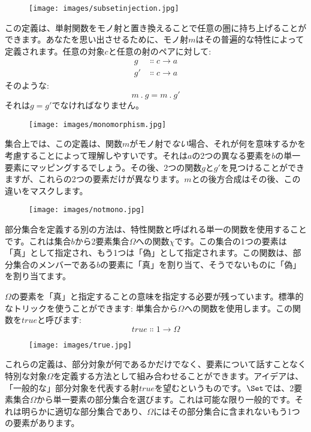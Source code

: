 \begin{figure}[H]
  \centering
  \texttt{[image: images/subsetinjection.jpg]}
\end{figure}

\noindent
この定義は、単射関数をモノ射と置き換えることで任意の圏に持ち上げることができます。あなたを思い出させるために、モノ射\(m\)はその普遍的な特性によって定義されます。任意の対象\(c\)と任意の射のペアに対して: 
\begin{align*}
  g  & \Colon c \to a \\
  g' & \Colon c \to a
\end{align*}
そのような: 
\[m\ .\ g = m\ .\ g'\]
それは\(g = g'\)でなければなりません。\begin{figure}[H]
  \centering
  \texttt{[image: images/monomorphism.jpg]}
\end{figure}

\noindent
集合上では、この定義は、関数\(m\)がモノ射で\emph{ない}場合、それが何を意味するかを考慮することによって理解しやすいです。それは\(a\)の2つの異なる要素を\(b\)の単一要素にマッピングするでしょう。その後、2つの関数\(g\)と\(g'\)を見つけることができますが、これらの2つの要素だけが異なります。\(m\)との後方合成はその後、この違いをマスクします。

\begin{figure}[H]
  \centering
  \texttt{[image: images/notmono.jpg]}
\end{figure}

\noindent
部分集合を定義する別の方法は、特性関数と呼ばれる単一の関数を使用することです。これは集合\(b\)から2要素集合\(\Omega\)への関数\(\chi\)です。この集合の1つの要素は「真」として指定され、もう1つは「偽」として指定されます。この関数は、部分集合のメンバーである\(b\)の要素に「真」を割り当て、そうでないものに「偽」を割り当てます。

\(\Omega\)の要素を「真」と指定することの意味を指定する必要が残っています。標準的なトリックを使うことができます: 単集合から\(\Omega\)への関数を使用します。この関数を\(\mathit{true}\)と呼びます: 
\[\mathit{true} \Colon 1 \to \Omega\]

\begin{figure}[H]
  \centering
  \texttt{[image: images/true.jpg]}
\end{figure}

\noindent
これらの定義は、部分対象が何であるかだけでなく、要素について話すことなく特別な対象\(\Omega\)を定義する方法として組み合わせることができます。アイデアは、「一般的な」部分対象を代表する射\(\mathit{true}\)を望むというものです。\(\Set\)では、2要素集合\(\Omega\)から単一要素の部分集合を選びます。これは可能な限り一般的です。それは明らかに適切な部分集合であり、\(\Omega\)にはその部分集合に含まれないもう1つの要素があります。

